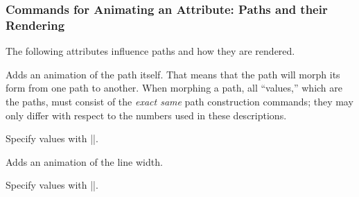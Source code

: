 \subsubsection{Commands for Animating an Attribute: Paths and their Rendering}

The following attributes influence paths and how they are rendered.

\begin{command}{\pgfsys@animatepath}
  Adds an animation of the path itself. That means that the path will
  morph its form from one path to another. When morphing a path, all
  ``values,'' which are the paths, must consist of the  \emph{exact
    same} path construction commands; they may only differ with
  respect to the numbers used in these descriptions.
  
  Specify values with |\pgfsys@animation@path|.
\begin{codeexample}[width=2.3cm]
\end{codeexample}
\end{command}

\begin{command}{\pgfsys@animatelinewidth}
  Adds an animation of the line width.
  
  Specify values with |\pgfsys@animation@dimension|.
\begin{codeexample}[width=2cm]
\end{codeexample}
\end{command}



